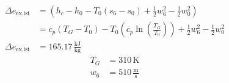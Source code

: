 

\item[c)] 
        \begin{align*}
            \Delta e_{\text{ex,ist}} &= (h_c - h_0 - T_0 (s_6 - s_0) + \frac{1}{2} w_{6}^2 - \frac{1}{2} w_{0}^2) \\
            &= c_p (T_G - T_0) - T_0 \left( c_p \ln \left( \frac{T_G}{T_0} \right) \right) + \frac{1}{2} w_{6}^2 - \frac{1}{2} w_{0}^2 \\
            \Delta e_{\text{ex,ist}} &= 165.17 \, \frac{\text{kJ}}{\text{kg}}
        \end{align*}
        \begin{align*}
            T_G &= 310 \, \text{K} \\
            w_{6} &= 510 \, \frac{\text{m}}{\text{s}}
        \end{align*}